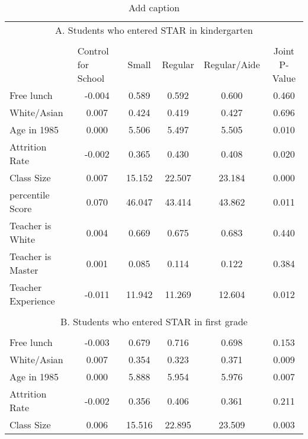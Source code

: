 \documentclass{article}
\begin{document}
{{{{{{{{%
\begin{table}[htbp]
  \centering
  \caption{Add caption}
  \label{tab:sub7}
    \begin{tabular}{llccccc}
    \toprule
    \multicolumn{7}{c}{A. Students who entered STAR in kindergarten} \\
          &       &       &       &       &       &  \\
          &       & \multicolumn{1}{l}{Control for School} & Small & Regular & Regular/Aide & Joint P-Value \\
    \midrule
    \midrule
    \multicolumn{2}{l}{Free lunch} & -0.004  & 0.589  & 0.592  & 0.600  & 0.460  \\
    \multicolumn{2}{l}{White/Asian} & 0.007  & 0.424  & 0.419  & 0.427  & 0.696  \\
    \multicolumn{2}{l}{Age in 1985} & 0.000  & 5.506  & 5.497  & 5.505  & 0.010  \\
    \multicolumn{2}{l}{Attrition Rate} & -0.002  & 0.365  & 0.430  & 0.408  & 0.020  \\
    \multicolumn{2}{l}{Class Size} & 0.007  & 15.152  & 22.507  & 23.184  & 0.000  \\
    \multicolumn{2}{l}{percentile Score} & 0.070  & 46.047  & 43.414  & 43.862  & 0.011  \\
    \multicolumn{2}{l}{Teacher is White} & 0.004  & 0.669  & 0.675  & 0.683  & 0.440  \\
    \multicolumn{2}{l}{Teacher is Master} & 0.001  & 0.085  & 0.114  & 0.122  & 0.384  \\
    \multicolumn{2}{l}{Teacher Experience} & -0.011  & 11.942  & 11.269  & 12.604  & 0.012  \\
          &       &       &       &       &       &  \\
    \multicolumn{7}{c}{B. Students who entered STAR in first grade} \\
          &       &       &       &       &       &  \\
    \multicolumn{2}{l}{Free lunch} & -0.003  & 0.679  & 0.716  & 0.698  & 0.153  \\
    \multicolumn{2}{l}{White/Asian} & 0.007  & 0.354  & 0.323  & 0.371  & 0.009  \\
    \multicolumn{2}{l}{Age in 1985} & 0.000  & 5.888  & 5.954  & 5.976  & 0.007  \\
    \multicolumn{2}{l}{Attrition Rate} & -0.002  & 0.356  & 0.406  & 0.361  & 0.211  \\
    \multicolumn{2}{l}{Class Size} & 0.006  & 15.516  & 22.895  & 23.509  & 0.003  \\

\end{tabular}
\end{table}}}}}}}}}
\end{document}
